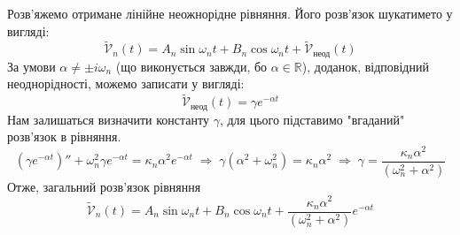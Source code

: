 Розв'яжемо отримане лінійне неожнорідне рівняння. Його розв'язок шукатимето у вигляді:
\begin{equation}
    \widetilde{\mathcal{V}}_n(t) = A_n \sin\omega_nt + B_n \cos\omega_nt + \widetilde{\mathcal{V}}_{\text{неод}}(t)
\end{equation}
За умови $\alpha \neq \pm i\omega_n$ (що виконується завжди, бо $\alpha \in \mathbb{R}$), доданок, відповідний неоднорідності, можемо записати у вигляді: 
\[\widetilde{\mathcal{V}}_{\text{неод}}(t) = \gamma e^{-\alpha t}\]
Нам залишаться визначити константу $\gamma$, для цього підставимо "вгаданий"\\ розв'язок в рівняння. 
\begin{equation*}
    (\gamma e^{-\alpha t})'' + \omega_n^2 \gamma e^{-\alpha t} = \kappa_n\alpha^2 e^{-\alpha t}
    \;\Rightarrow\;
    \gamma(\alpha^2 + \omega_n^2) = \kappa_n\alpha^2
    \;\Rightarrow\;
    \gamma = \frac{\kappa_n\alpha^2}{(\omega_n^2 + \alpha^2)}
\end{equation*}
Отже, загальний розв'язок рівняння 
\begin{equation} \label{gen-time-sol}
    \widetilde{\mathcal{V}}_n(t) = A_n \sin\omega_nt + B_n \cos\omega_nt + \frac{\kappa_n\alpha^2}{(\omega_n^2 + \alpha^2)} e^{-\alpha t}
\end{equation}  

